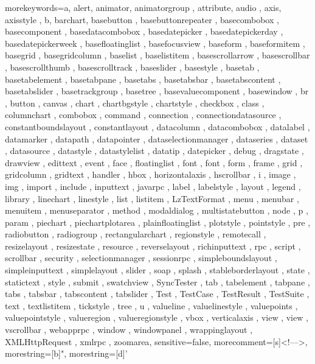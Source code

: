  {morekeywords={a, alert, animator, animatorgroup , attribute, audio , axis, axisstyle , b, barchart, basebutton , basebuttonrepeater , basecombobox , basecomponent , basedatacombobox , basedatepicker , basedatepickerday , basedatepickerweek , basefloatinglist , basefocusview , baseform , baseformitem , basegrid , basegridcolumn , baselist , baselistitem , basescrollarrow , basescrollbar , basescrollthumb , basescrolltrack , baseslider , basestyle , basetab , basetabelement , basetabpane , basetabs , basetabsbar , basetabscontent , basetabslider , basetrackgroup , basetree , basevaluecomponent , basewindow , br , button , canvas , chart , chartbgstyle , chartstyle , checkbox , class , columnchart , combobox , command , connection , connectiondatasource , constantboundslayout , constantlayout , datacolumn , datacombobox , datalabel , datamarker , datapath , datapointer , dataselectionmanager , dataseries , dataset , datasource , datastyle , datastylelist , datatip , datepicker , debug , dragstate , drawview , edittext , event , face , floatinglist , font , font , form , frame , grid , gridcolumn , gridtext , handler , hbox , horizontalaxis , hscrollbar , i , image , img , import , include , inputtext , javarpc , label , labelstyle , layout , legend , library , linechart , linestyle , list , listitem , LzTextFormat , menu , menubar , menuitem , menuseparator , method , modaldialog , multistatebutton , node , p , param , piechart , piechartplotarea , plainfloatinglist , plotstyle , pointstyle , pre , radiobutton , radiogroup , rectangularchart , regionstyle , remotecall , resizelayout , resizestate , resource , reverselayout , richinputtext , rpc , script , scrollbar , security , selectionmanager , sessionrpc , simpleboundslayout , simpleinputtext , simplelayout , slider , soap , splash , stableborderlayout , state , statictext , style , submit , swatchview , SyncTester , tab , tabelement , tabpane , tabs , tabsbar , tabscontent , tabslider , Test , TestCase , TestResult , TestSuite , text , textlistitem , tickstyle , tree , u , valueline , valuelinestyle , valuepoints , valuepointstyle , valueregion , valueregionstyle , vbox , verticalaxis , view , view , vscrollbar , webapprpc , window , windowpanel , wrappinglayout , XMLHttpRequest , xmlrpc , zoomarea},
sensitive=false, morecomment=[s]{<!--}{-->}, morestring=[b]", morestring=[d]'}


